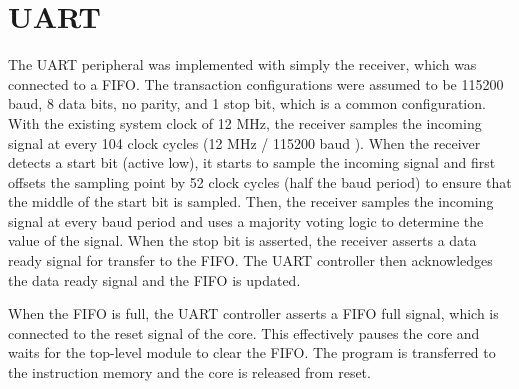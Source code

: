 \section{UART}

The UART peripheral was implemented with simply the receiver, which was connected to a FIFO. The transaction configurations were assumed to be 115200 baud, 8 data bits, no parity, and 1 stop bit, which is a common configuration. With the existing system clock of 12 MHz, the receiver samples the incoming signal at every 104 clock cycles (12 MHz / 115200 baud ). When the receiver detects a start bit (active low), it starts to sample the incoming signal and first offsets the sampling point by 52 clock cycles (half the baud period) to ensure that the middle of the start bit is sampled. Then, the receiver samples the incoming signal at every baud period and uses a majority voting logic to determine the value of the signal. When the stop bit is asserted, the receiver asserts a data ready signal for transfer to the FIFO. The UART controller then acknowledges the data ready signal and the FIFO is updated. 

When the FIFO is full, the UART controller asserts a FIFO full signal, which is connected to the reset signal of the core. This effectively pauses the core and waits for the top-level module to clear the FIFO. The program is transferred to the instruction memory and the core is released from reset. 
